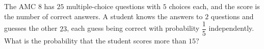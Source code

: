The AMC 8 has $25$ multiple-choice questions with $5$ choices each, and the score is the number of correct answers. A student knows the answers to $2$ questions and guesses the other $23$, each guess being correct with probability $\dfrac15$ independently. What is the probability that the student scores more than $15$?
